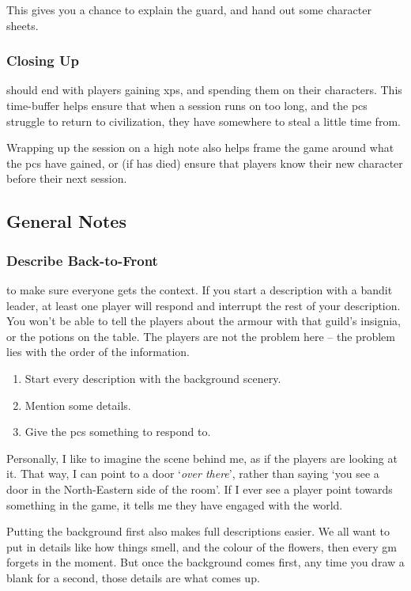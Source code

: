 \begin{multicols}{2}
This gives you a chance to explain the \gls{guard}, and hand out some character sheets.

\subsubsection{Closing Up}
should end with players gaining \glspl{xp}, and spending them on their characters.
This time-buffer helps ensure that when a session runs on too long, and the \glspl{pc} struggle to return to civilization, they have somewhere to steal a little time from.

Wrapping up the session on a high note also helps frame the game around what the \glspl{pc} have gained, or (if  has died) ensure that players know their new character before their next session.

\subsection{General Notes}

\subsubsection{Describe Back-to-Front}
to make sure everyone gets the context.
If you start a description with a bandit leader, at least one player will respond and interrupt the rest of your description.
You won't be able to tell the players about the armour with that guild's insignia, or the potions on the table.
The players are not the problem here -- the problem lies with the order of the information.

\begin{enumerate}
  \item
  Start every description with the background scenery.
  \item
  Mention some details.
  \item
  Give the \glspl{pc} something to respond to.
\end{enumerate}

Personally, I like to imagine the scene behind me, as if the players are looking at it.
That way, I can point to a door `\emph{over there}', rather than saying `you see a door in the North-Eastern side of the room'.
If I ever see a player point towards something in the game, it tells me they have engaged with the world.

Putting the background first also makes full descriptions easier.
We all want to put in details like how things smell, and the colour of the flowers, then every \gls{gm} forgets in the moment.
But once the background comes first, any time you draw a blank for a second, those details are what comes up.


\end{multicols}
